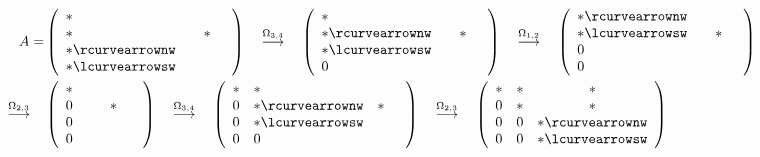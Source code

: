 \documentclass[ngerman,fontsize=11pt, paper=a4, parskip=half, titlepage=true, toc=bib]{scrbook}
\theoremstyle{definition}
\theoremstyle{plain}
\begin{document}
\begin{align*}
  A= &
       \left(\begin{array}{lccc}
               *~ &&&\\
               * &&* \\
               * \rcurvearrownw \\ * \lcurvearrowsw
             \end{array}\right)
  \quad \overset{\Omega_{3,4}}{\longrightarrow} \quad
  \left(\begin{array}{lccc}
          *~ &&&\\
          * \rcurvearrownw && *\\
          * \lcurvearrowsw \\
          0
        \end{array}\right)
  \quad \overset{\Omega_{1,2}}{\longrightarrow} \quad
  \left(\begin{array}{lccc}
          * \rcurvearrownw\\
          * \lcurvearrowsw && *& \\
          0 \\
          0
        \end{array}\right)\\
  \quad \overset{\Omega_{2,3}}{\longrightarrow} \quad
     &\left(\begin{array}{lccc}
              *~~ \\
              0 && *&~ \\
              0 \\
              0
            \end{array}\right)
  \quad \overset{\Omega_{3,4}}{\longrightarrow} \quad	
  \left(\begin{array}{clcc}
          * & *\\
          0 & *  \rcurvearrownw  & *& \\
          0 & * \lcurvearrowsw \\
          0 & 0
        \end{array}\right)
              \quad \overset{\Omega_{2,3}}{\longrightarrow} \quad	
              \left(\begin{array}{cccl}
                      * & *  & * \\
                      0 & *  & * \\ 
                      0 & 0 & * \rcurvearrownw\\
                      0 & 0 & *  \lcurvearrowsw 
                    \end{array}\right) \\

\end{align*}
\end{document}
